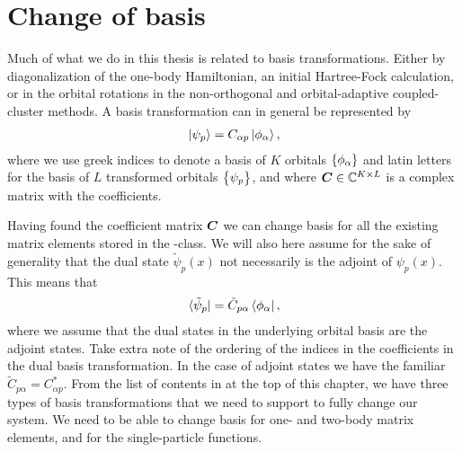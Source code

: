     \section{Change of basis}
        \label{sec:change-of-basis}
        Much of what we do in this thesis is related to basis transformations.
        Either by diagonalization of the one-body Hamiltonian, an initial
        Hartree-Fock calculation, or in the orbital rotations in the
        non-orthogonal and orbital-adaptive coupled-cluster methods.
        A basis transformation can in general be represented by
        \begin{align}
            \ket*{\psi_p} = C_{\alpha p} \ket*{\phi_{\alpha}},
            \label{eq:spf-basis-change}
        \end{align}
        where we use greek indices to denote a basis of $K$ orbitals
        $\left\{ \phi_{\alpha} \right\}$ and latin letters for the basis of $L$
        transformed orbitals $\left\{ \psi_p \right\}$, and where $\boldsymbol{C} \in
        \mathbb{C}^{K\times L}$ is a complex matrix with the coefficients.

        Having found the coefficient matrix $\boldsymbol{C}$ we can change basis for
        all the existing matrix elements stored in the
        -class.
        We will also here assume for the sake of generality that the dual state
        $\tilde{\psi}_p(x)$ not necessarily is the adjoint of $\psi_p(x)$.
        This means that
        \begin{align}
            \bra*{\tilde{\psi}_p}
            = \tilde{C}_{p \alpha}\bra*{\phi_{\alpha}},
            \label{eq:spf-dual-basis-change}
        \end{align}
        where we assume that the dual states in the underlying orbital basis are
        the adjoint states.
        Take extra note of the ordering of the indices in the coefficients in
        the dual basis transformation.
        In the case of adjoint states we have the familiar $\tilde{C}_{p \alpha}
        = C^{*}_{\alpha p}$.
        From the list of contents in  at the top of this
        chapter, we have three types of basis transformations that we need to
        support to fully change our system.
        We need to be able to change basis for one- and two-body matrix
        elements, and for the single-particle functions.

